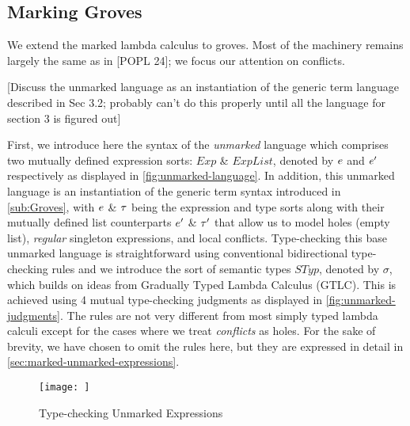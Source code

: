 
\subsection{Marking Groves}
\label{sub:marking-groves}
We extend the marked lambda calculus to groves. Most of the machinery remains largely the same as in [POPL 24]; we focus our attention on conflicts.

[Discuss the unmarked language as an instantiation of the generic term language described in Sec 3.2; probably can't do this properly until all the language for section 3 is figured out]

First, we introduce here the syntax of the \emph{unmarked} language which comprises two mutually defined expression sorts: $Exp$ \& $ExpList$, denoted by $e$ and $e'$ respectively as displayed in \autoref{fig:unmarked-language}. In addition, this unmarked language is an instantiation of the generic term syntax introduced in \autoref{sub:Groves}, with $e$ \& $\tau$ being the expression and type sorts along with their mutually defined list counterparts $e'$ \& $\tau'$ that allow us to model holes (empty list), \emph{regular} singleton expressions, and local conflicts. Type-checking this base unmarked language is straightforward using conventional bidirectional type-checking rules and we introduce the sort of semantic types $STyp$, denoted by $\sigma$, which builds on ideas from  Gradually Typed Lambda Calculus (GTLC). This is achieved using 4 mutual type-checking judgments as displayed in \autoref{fig:unmarked-judgments}. The rules are not very different from most simply typed lambda calculi except for the cases where we treat \emph{conflicts} as holes. For the sake of brevity, we have chosen to omit the rules here, but they are expressed in detail in \autoref{sec:marked-unmarked-expressions}. 

\begin{figure}
    \judgbox{\ctxSynTypeU{\ctx}{\EMV}{\sigma}} 
    \judgbox{\ctxSynTypeU{\ctx}{\ELV}{\sigma}}
    \judgbox{\ctxAnaTypeU{\ctx}{\EMV}{\sigma}} 
    \judgbox{\ctxAnaTypeU{\ctx}{\ELV}{\sigma}}
    \centering
    \texttt{[image: ]}
    \caption{Type-checking Unmarked Expressions}
    \label{fig:unmarked-judgments}
\end{figure}

